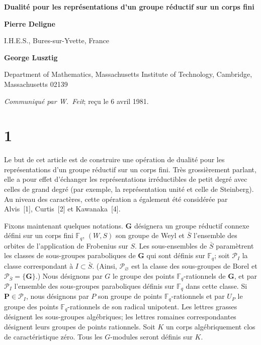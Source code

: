 \documentclass[10pt,a4paper]{article}
\theoremstyle{plain}
\theoremstyle{definition}
\theoremstyle{remark}
\newcommand{\F}{\mathbb{F}}
\newcommand{\cP}{\mathcal{P}}
\newcommand{\bG}{\mathbf{G}}
\newcommand{\bP}{\mathbf{P}}
\begin{document}
\small

\thispagestyle{empty}
\begin{center}
{\Large\bfseries Dualité pour les représentations d'un groupe réductif sur un corps fini\par}
\vspace{5pt}
{\normalsize\bfseries Pierre Deligne}\par
{\small I.H.E.S., Bures-sur-Yvette, France}\par
\vspace{2pt}
{\normalsize\bfseries George Lusztig}\par
{\small Department of Mathematics, Massachusetts Institute of Technology, Cambridge, Massachusetts 02139}\par
\vspace{4pt}
{\small \textit{Communiqué par W.~Feit}; reçu le 6 avril 1981.}\par
\end{center}

\section*{1}

Le but de cet article est de construire une opération de dualité pour les représentations d'un groupe réductif sur un corps fini. Très grossièrement parlant, elle a pour effet d'échanger les représentations irréductibles de petit degré avec celles de grand degré (par exemple, la représentation unité et celle de Steinberg). Au niveau des caractères, cette opération a également été considérée par Alvis~[1], Curtis~[2] et Kawanaka~[4].

Fixons maintenant quelques notations. $\bG$ désignera un groupe réductif connexe défini sur un corps fini $\F_q$, $(W,S)$ son groupe de Weyl et $\bar S$ l'ensemble des orbites de l'application de Frobenius sur $S$. Les sous-ensembles de $\bar S$ paramètrent les classes de sous-groupes paraboliques de $\bG$ qui sont définis sur $\F_q$; soit $\cP_I$ la classe correspondant à $I \subset \bar S$. (Ainsi, $\cP_\varnothing$ est la classe des sous-groupes de Borel et $\cP_{\bar S}=\{\bG\}$.) Nous désignons par $G$ le groupe des points $\F_q$-rationnels de $\bG$, et par $\cP_I$ l'ensemble des sous-groupes paraboliques définis sur $\F_q$ dans cette classe. Si $\bP \in \cP_I$, nous désignons par $P$ son groupe de points $\F_q$-rationnels et par $U_P$ le groupe des points $\F_q$-rationnels de son radical unipotent. Les lettres grasses désignent les sous-groupes algébriques; les lettres romaines correspondantes désignent leurs groupes de points rationnels. Soit $K$ un corps algébriquement clos de caractéristique zéro. Tous les $G$-modules seront définis sur $K$.
\end{document}
